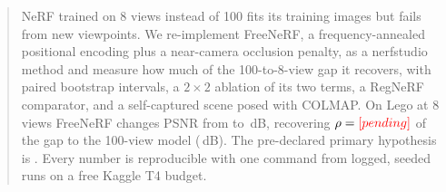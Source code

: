 \begin{abstract}
NeRF trained on 8 views instead of 100 fits its training images but fails from new viewpoints. We re-implement FreeNeRF, a frequency-annealed positional encoding plus a near-camera occlusion penalty, as a nerfstudio method and measure how much of the 100-to-8-view gap it recovers, with paired bootstrap intervals, a $2\times2$ ablation of its two terms, a RegNeRF comparator, and a self-captured scene posed with COLMAP. On Lego at 8 views FreeNeRF changes PSNR from \LegoAPsnr{} to \LegoDPsnr\,dB, recovering $\rho=\LegoRho$ of the gap to the 100-view model (\LegoGap\,dB). The pre-declared primary hypothesis is \HTwoStatus. Every number is reproducible with one command from logged, seeded runs on a free Kaggle T4 budget.
\end{abstract}
